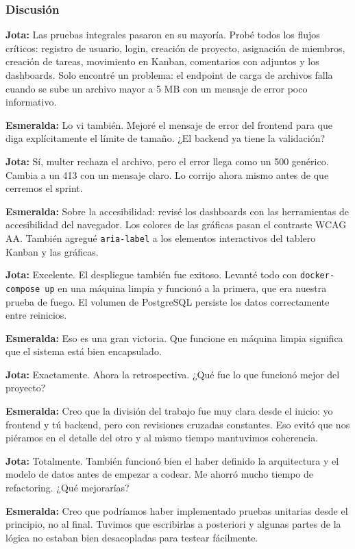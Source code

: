 \documentclass[12pt, a4paper]{article}
\newcommand{\jota}[1]{\noindent\textbf{\color{primary}Jota:} #1\par\smallskip}
\newcommand{\esme}[1]{\noindent\textbf{\color{accentgreen}Esmeralda:} #1\par\smallskip}
\begin{document}
\subsubsection*{Discusión}

\jota{Las pruebas integrales pasaron en su mayoría. Probé todos los flujos críticos: registro de usuario, login, creación de proyecto, asignación de miembros, creación de tareas, movimiento en Kanban, comentarios con adjuntos y los dashboards. Solo encontré un problema: el endpoint de carga de archivos falla cuando se sube un archivo mayor a 5 MB con un mensaje de error poco informativo.}

\esme{Lo vi también. Mejoré el mensaje de error del frontend para que diga explícitamente el límite de tamaño. ¿El backend ya tiene la validación?}

\jota{Sí, multer rechaza el archivo, pero el error llega como un 500 genérico. Cambia a un 413 con un mensaje claro. Lo corrijo ahora mismo antes de que cerremos el sprint.}

\esme{Sobre la accesibilidad: revisé los dashboards con las herramientas de accesibilidad del navegador. Los colores de las gráficas pasan el contraste WCAG AA. También agregué \texttt{aria-label} a los elementos interactivos del tablero Kanban y las gráficas.}

\jota{Excelente. El despliegue también fue exitoso. Levanté todo con \texttt{docker-compose up} en una máquina limpia y funcionó a la primera, que era nuestra prueba de fuego. El volumen de PostgreSQL persiste los datos correctamente entre reinicios.}

\esme{Eso es una gran victoria. Que funcione en máquina limpia significa que el sistema está bien encapsulado.}

\jota{Exactamente. Ahora la retrospectiva. ¿Qué fue lo que funcionó mejor del proyecto?}

\esme{Creo que la división del trabajo fue muy clara desde el inicio: yo frontend y tú backend, pero con revisiones cruzadas constantes. Eso evitó que nos piéramos en el detalle del otro y al mismo tiempo mantuvimos coherencia.}

\jota{Totalmente. También funcionó bien el haber definido la arquitectura y el modelo de datos antes de empezar a codear. Me ahorró mucho tiempo de refactoring. ¿Qué mejorarías?}

\esme{Creo que podríamos haber implementado pruebas unitarias desde el principio, no al final. Tuvimos que escribirlas a posteriori y algunas partes de la lógica no estaban bien desacopladas para testear fácilmente.}
\end{document}
